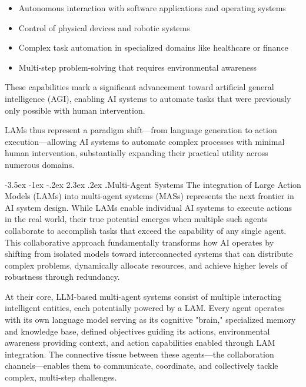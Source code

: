 \documentclass[journal,twoside,10pt]{IEEEtran}
\makeatletter
\renewcommand\section{\@startsection{section}{1}{\z@}%
                       {-3.5ex \@plus -1ex \@minus -.2ex}%
                       {2.3ex \@plus.2ex}%
                       {\normalfont\Large\bfseries\Roman{section}.\quad}}
\makeatother
\begin{document}
\begin{itemize}
    \item Autonomous interaction with software applications and operating systems
    \item Control of physical devices and robotic systems
    \item Complex task automation in specialized domains like healthcare or finance
    \item Multi-step problem-solving that requires environmental awareness
\end{itemize}

These capabilities mark a significant advancement toward artificial general intelligence (AGI), enabling AI systems to automate tasks that were previously only possible with human intervention.

LAMs thus represent a paradigm shift—from language generation to action execution—allowing AI systems to automate complex processes with minimal human intervention, substantially expanding their practical utility across numerous domains.

\section{Multi-Agent Systems}
The integration of Large Action Models (LAMs) into multi-agent systems (MASs) represents the next frontier in AI system design. While LAMs enable individual AI systems to execute actions in the real world, their true potential emerges when multiple such agents collaborate to accomplish tasks that exceed the capability of any single agent. This collaborative approach fundamentally transforms how AI operates by shifting from isolated models toward interconnected systems that can distribute complex problems, dynamically allocate resources, and achieve higher levels of robustness through redundancy.

At their core, LLM-based multi-agent systems consist of multiple interacting intelligent entities, each potentially powered by a LAM. Every agent operates with its own language model serving as its cognitive "brain," specialized memory and knowledge base, defined objectives guiding its actions, environmental awareness providing context, and action capabilities enabled through LAM integration. The connective tissue between these agents—the collaboration channels—enables them to communicate, coordinate, and collectively tackle complex, multi-step challenges.
\end{document}
